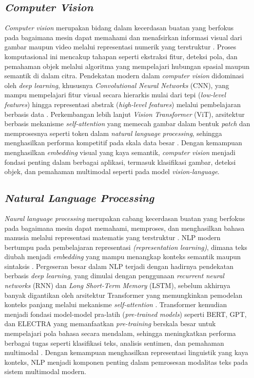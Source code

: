 \subsection{\textit{Computer Vision}} \label{II.teori2}
\textit{Computer vision} merupakan bidang dalam kecerdasan buatan yang berfokus pada bagaimana mesin dapat memahami dan menafsirkan informasi visual dari gambar maupun video melalui representasi numerik yang terstruktur \cite{sciencedirect_computer_vision_overview}. Proses komputasional ini mencakup tahapan seperti ekstraksi fitur, deteksi pola, dan pemahaman objek melalui algoritma yang mempelajari hubungan spasial maupun semantik di dalam citra. Pendekatan modern dalam \textit{computer vision} didominasi oleh \textit{deep learning}, khususnya \textit{Convolutional Neural Networks} (CNN), yang mampu mempelajari fitur visual secara hierarkis mulai dari tepi (\textit{low-level features}) hingga representasi abstrak (\textit{high-level features}) melalui pembelajaran berbasis data \cite{lecun2015deep}. Perkembangan lebih lanjut \textit{Vision Transformer} (ViT), arsitektur berbasis mekanisme \textit{self-attention} yang memecah gambar dalam bentuk \textit{patch} dan memprosesnya seperti token dalam \textit{natural language processing}, sehingga menghasilkan performa kompetitif pada skala data besar \cite{dosovitskiy2020image}. Dengan kemampuan menghasilkan \textit{embedding} visual yang kaya semantik, \textit{computer vision}  menjadi fondasi penting dalam berbagai aplikasi, termasuk klasifikasi gambar, deteksi objek, dan pemahaman multimodal seperti pada model \textit{vision-language}.

\subsection{\textit{Natural Language Processing} } \label{II.teori3}
\textit{Naural language processing} merupakan cabang kecerdasan buatan yang berfokus pada bagaimana mesin dapat memahami, memproses, dan menghasilkan bahasa manusia melalui representasi matematis yang terstruktur \cite{jurafsky2026slp}. NLP modern bertumpu pada pembelajaran representasi \textit{(representation learning)}, dimana teks diubah menjadi \textit{embedding} yang mampu menangkap konteks semantik maupun sintaksis \cite{liu2018neural}. Pergeseran besar dalam NLP terjadi dengan hadirnya pendekatan berbasis \textit{deep learning}, yang dimulai dengan penggunaan \textit{recurrent neural networks} (RNN) dan \textit{Long Short-Term Memory} (LSTM), sebelum akhirnya banyak digantikan oleh arsitektur Transformer yang memungkinkan pemodelan konteks panjang melalui mekanisme \textit{self-attention} \cite{young2017recent}. Transformer kemudian menjadi fondasi model-model pra-latih (\textit{pre-trained models}) seperti BERT, GPT, dan ELECTRA yang memanfaatkan \textit{pre-training} berskala besar untuk mempelajari pola bahasa secara mendalam, sehingga meningkatkan performa berbagai tugas seperti klasifikasi teks, analisis sentimen, dan pemahaman multimodal \cite{devlin2018bert}. Dengan kemampuan menghasilkan representasi linguistik yang kaya konteks, NLP menjadi komponen penting dalam pemrosesan modalitas teks pada sistem multimodal modern. \par


